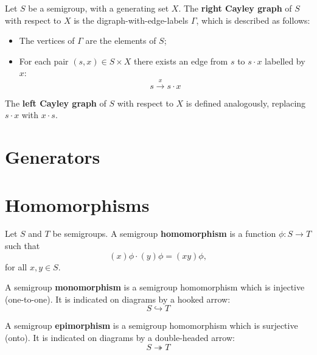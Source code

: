 \begin{definition}
  \label{def:cayley-graph}
  Let $S$ be a semigroup, with a generating set $X$.  The \textbf{right Cayley
    graph} of $S$ with respect to $X$ is the digraph-with-edge-labels $\Gamma$,
  which is described as follows:
  \begin{itemize}
  \item The vertices of $\Gamma$ are the elements of $S$;
  \item For each pair $(s, x) \in S \times X$ there exists an edge from $s$ to
    $s \cdot x$ labelled by $x$:
    $$s \overset{x}{\longrightarrow} s \cdot x$$
  \end{itemize}
  The \textbf{left Cayley graph} of $S$ with respect to $X$ is defined
  analogously, replacing $s \cdot x$ with $x \cdot s$.
\end{definition}

\section{Generators}
\label{sec:generators}

\section{Homomorphisms}
\label{sec:homomorphisms}

\begin{definition}
  \label{def:homomorphism}
  Let $S$ and $T$ be semigroups.  A semigroup \textbf{homomorphism} is a
  function $\phi: S \to T$ such that
  $$(x)\phi \cdot (y)\phi = (xy)\phi,$$
  for all $x, y \in S$.
\end{definition}

\begin{definition}
  \label{def:monomorphism}
  A semigroup \textbf{monomorphism} is a semigroup homomorphism which is
  injective (one-to-one).  It is indicated on diagrams by a hooked arrow:
  $$S \hookrightarrow T$$
\end{definition}

\begin{definition}
  \label{def:epimorphism}
  A semigroup \textbf{epimorphism} is a semigroup homomorphism which is
  surjective (onto).  It is indicated on diagrams by a double-headed arrow:
  $$S \twoheadrightarrow T$$
\end{definition}

